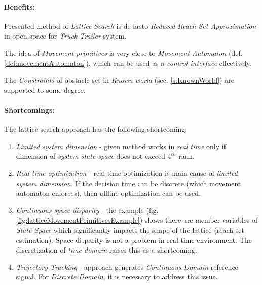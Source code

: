 \paragraph{Benefits:} Presented method of \emph{Lattice Search}  is  de-facto \emph{Reduced Reach Set Approximation} in open space for \emph{Truck-Trailer} system. 

The idea of \emph{Movement primitives} is very close to \emph{Movement Automaton} (def. \ref{def:movementAutomaton}), which can be used as a \emph{control interface} effectively. 

The \emph{Constraints} of obstacle set in \emph{Known world} (sec. \ref{s:KnownWorld}) are supported to some degree.

\paragraph{Shortcomings:} The lattice search approach has the following shortcoming:
\begin{enumerate}
    \item \emph{Limited system dimension} - given method works in \emph{real time} only if dimension of \emph{system state space} does not exceed $4^{th}$  rank.
    
    \item \emph{Real-time optimization} - real-time optimization is main cause of \emph{limited system dimension}. If the decision time can be discrete (which movement automaton enforces), then offline optimization  can be used. 
    
    \item \emph{Continuous space disparity} - the example (fig. \ref{fig:latticeMovementPrimitivesExample}) shows there are member variables of \emph{State Space} which significantly impacts the shape of the lattice (reach set estimation). Space disparity  is not a problem in real-time environment. The discretization of \emph{time-domain} raises this as a shortcoming.
    
    \item \emph{Trajectory Tracking} - approach generates \emph{Continuous Domain} reference signal. For \emph{Discrete Domain}, it is necessary to address this issue.
\end{enumerate}

 




